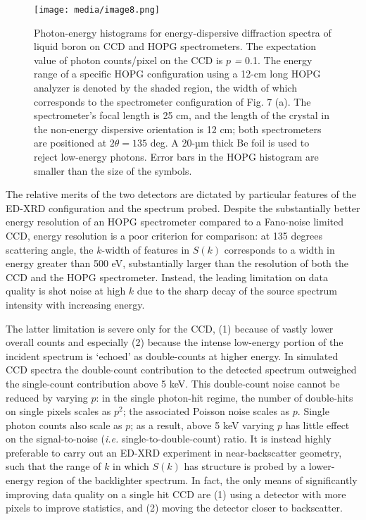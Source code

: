 \begin{figure}[h] 
\caption{ Photon-energy histograms for energy-dispersive diffraction
spectra of liquid boron on CCD and HOPG spectrometers. The expectation
value of photon counts/pixel on the CCD is \(p\) \emph{=} 0.1. The
energy range of a specific HOPG configuration using a 12-cm long HOPG
analyzer is denoted by the shaded region, the width of which corresponds
to the spectrometer configuration of Fig. 7 (a). The spectrometer's
focal length is 25 cm, and the length of the crystal in the non-energy
dispersive orientation is 12 cm; both spectrometers are positioned at
\(2\theta = 135\) deg. A 20-µm thick Be foil is used to reject
low-energy photons. Error bars in the HOPG histogram are smaller than
the size of the symbols.}
\label{edimage8}
\centering
\texttt{[image: media/image8.png]}
\end{figure}

The relative merits of the two detectors are dictated by particular
features of the ED-XRD configuration and the spectrum probed. Despite
the substantially better energy resolution of an HOPG spectrometer
compared to a Fano-noise limited CCD, energy resolution is a poor
criterion for comparison: at 135 degrees scattering angle, the
\(k\)-width of features in \(S(k)\) corresponds to a width in energy
greater than 500 eV, substantially larger than the resolution of both
the CCD and the HOPG spectrometer. Instead, the leading limitation on
data quality is shot noise at high \(k\) due to the sharp decay of the
source spectrum intensity with increasing energy.

The latter limitation is severe only for the CCD, (1) because of vastly
lower overall counts and especially (2) because the intense low-energy
portion of the incident spectrum is `echoed' as double-counts at higher
energy. In simulated CCD spectra the double-count contribution to the
detected spectrum outweighed the single-count contribution above 5 keV.
This double-count noise cannot be reduced by varying \(p\): in the
single photon-hit regime, the number of double-hits on single pixels
scales as \(p^{2}\); the associated Poisson noise scales as \(p\).
Single photon counts also scale as \(p\); as a result, above 5 keV
varying \(p\) has little effect on the signal-to-noise (\emph{i.e.}
single-to-double-count) ratio. It is instead highly preferable to carry
out an ED-XRD experiment in near-backscatter geometry, such that the
range of \(k\) in which \(S(k)\) has structure is probed by a
lower-energy region of the backlighter spectrum. In fact, the only means
of significantly improving data quality on a single hit CCD are (1)
using a detector with more pixels to improve statistics, and (2) moving
the detector closer to backscatter.

